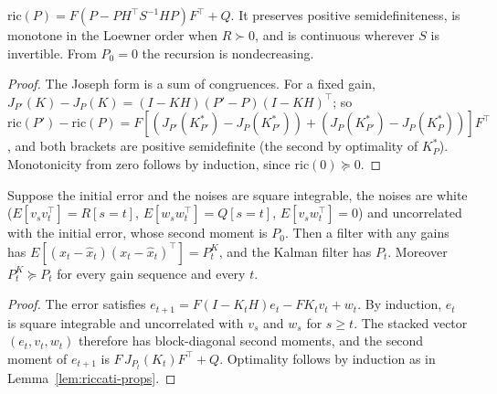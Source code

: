 \begin{lemma}
\label{lem:riccati-props}
\leanok
{}
$\mathrm{ric}(P) = F(P - PH^\top S^{-1}HP)F^\top + Q$. It preserves positive semidefiniteness, is monotone in the
Loewner order when $R\succ0$, and is continuous wherever $S$ is invertible. From $P_0 = 0$ the recursion is nondecreasing.
\end{lemma}
\begin{proof}
\leanok
The Joseph form is a sum of congruences. For a fixed gain, $J_{P'}(K) - J_P(K) = (I-KH)(P'-P)(I-KH)^\top$; so
$\mathrm{ric}(P') - \mathrm{ric}(P) = F[(J_{P'}(K^*_{P'}) - J_P(K^*_{P'})) + (J_P(K^*_{P'}) - J_P(K^*_P))]F^\top$, and both
brackets are positive semidefinite (the second by optimality of $K^*_P$). Monotonicity from zero follows by induction,
since $\mathrm{ric}(0)\succeq0$.
\end{proof}

\begin{theorem}
\label{thm:kalman-mse}
\leanok
{}
Suppose the initial error and the noises are square integrable, the noises are white
($E[v_sv_t^\top] = R[s=t]$, $E[w_sw_t^\top] = Q[s=t]$, $E[v_sw_t^\top] = 0$) and uncorrelated with the initial error,
whose second moment is $P_0$. Then a filter with any gains has
$E[(x_t-\hat x_t)(x_t-\hat x_t)^\top] = P^K_t$, and the Kalman filter has $P_t$. Moreover $P^K_t\succeq P_t$ for every
gain sequence and every $t$.
\end{theorem}
\begin{proof}
\leanok
The error satisfies $e_{t+1} = F(I-K_tH)e_t - FK_tv_t + w_t$. By induction, $e_t$ is square integrable and uncorrelated
with $v_s$ and $w_s$ for $s\ge t$. The stacked vector $(e_t,v_t,w_t)$ therefore has block-diagonal second moments, and
the second moment of $e_{t+1}$ is $F\,J_{P_t}(K_t)F^\top + Q$. Optimality follows by induction as in
Lemma~\ref{lem:riccati-props}.
\end{proof}

